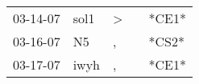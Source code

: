 \begin{supertabular}{lllll}
 03-14-07 &  sol1 &  \textgreater &   &  *CE1* \\
 03-16-07 &    N5 &             , &   &  *CS2* \\
 03-17-07 &  iwyh &             , &   &  *CE1* \\
\end{supertabular}
